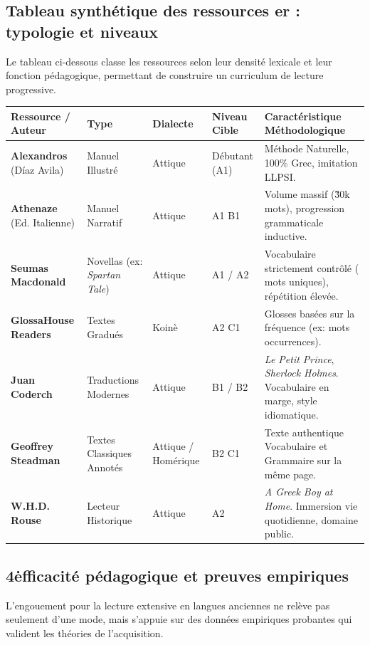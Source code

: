 \subsection{Tableau synthétique des ressources er : typologie et niveaux}

Le tableau ci-dessous classe les ressources selon leur densité lexicale et leur fonction
pédagogique, permettant de construire un curriculum de lecture progressive.

\begin{table}[h!]\small\centering\begin{tabular}{| l | l | l | l | l |}\hline\textbf{Ressource / Auteur} & \textbf{Type} & \textbf{Dialecte} & \textbf{Niveau Cible} & \textbf{Caractéristique Méthodologique} \\ \hline\textbf{Alexandros} (Díaz Avila) & Manuel Illustré & Attique & Débutant (A1) & Méthode Naturelle, 100\% Grec, imitation LLPSI. \\ \hline\textbf{Athenaze} (Ed. Italienne) & Manuel Narratif & Attique & A1 \-\> B1 & Volume massif (\~30k mots), progression grammaticale inductive. \\ \hline\textbf{Seumas Macdonald} & Novellas (ex: \textit{Spartan Tale}) & Attique & A1 / A2 & Vocabulaire strictement contrôlé (\<200 mots uniques), répétition élevée. \\ \hline\textbf{GlossaHouse Readers} & Textes Gradués & Koinè & A2 \-\> C1 & Glosses basées sur la fréquence (ex: mots \<50 occurrences). \\ \hline\textbf{Juan Coderch} & Traductions Modernes & Attique & B1 / B2 & \textit{Le Petit Prince}, \textit{Sherlock Holmes}. Vocabulaire en marge, style idiomatique. \\ \hline\textbf{Geoffrey Steadman} & Textes Classiques Annotés & Attique / Homérique & B2 \-\> C1 & Texte authentique \+ Vocabulaire et Grammaire sur la même page. \\ \hline\textbf{W.H.D. Rouse} & Lecteur Historique & Attique & A2 & \textit{A Greek Boy at Home}. Immersion vie quotidienne, domaine public. \\ \hline\end{tabular}\end{table}

\subsection{4\. efficacité pédagogique et preuves empiriques}

L'engouement pour la lecture extensive en langues anciennes ne relève pas seulement d'une mode, mais
s'appuie sur des données empiriques probantes qui valident les théories de l'acquisition.



